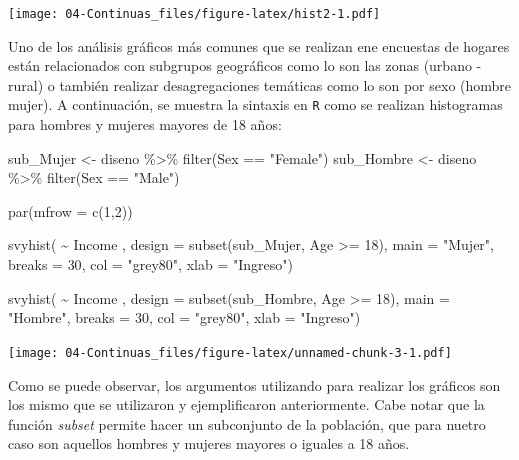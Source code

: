 \documentclass[
  12pt,
]{book}
\newenvironment{Shaded}{\begin{snugshade}}{\end{snugshade}}
\newcommand{\AttributeTok}[1]{\textcolor[rgb]{0.77,0.63,0.00}{#1}}
\newcommand{\DecValTok}[1]{\textcolor[rgb]{0.00,0.00,0.81}{#1}}
\newcommand{\FunctionTok}[1]{\textcolor[rgb]{0.00,0.00,0.00}{#1}}
\newcommand{\NormalTok}[1]{#1}
\newcommand{\OtherTok}[1]{\textcolor[rgb]{0.56,0.35,0.01}{#1}}
\newcommand{\SpecialCharTok}[1]{\textcolor[rgb]{0.00,0.00,0.00}{#1}}
\newcommand{\StringTok}[1]{\textcolor[rgb]{0.31,0.60,0.02}{#1}}
\begin{document}
\texttt{[image: 04-Continuas\_files/figure-latex/hist2-1.pdf]}

Uno de los análisis gráficos más comunes que se realizan ene encuestas de hogares están relacionados con subgrupos geográficos como lo son las zonas (urbano - rural) o también realizar desagregaciones temáticas como lo son por sexo (hombre mujer). A continuación, se muestra la sintaxis en \texttt{R} como se realizan histogramas para hombres y mujeres mayores de 18 años:

\begin{Shaded}
\begin{Highlighting}[]
\NormalTok{sub\_Mujer  }\OtherTok{\textless{}{-}}\NormalTok{ diseno }\SpecialCharTok{\%\textgreater{}\%}  \FunctionTok{filter}\NormalTok{(Sex }\SpecialCharTok{==} \StringTok{"Female"}\NormalTok{)}
\NormalTok{sub\_Hombre }\OtherTok{\textless{}{-}}\NormalTok{ diseno }\SpecialCharTok{\%\textgreater{}\%}  \FunctionTok{filter}\NormalTok{(Sex }\SpecialCharTok{==} \StringTok{"Male"}\NormalTok{)}

\FunctionTok{par}\NormalTok{(}\AttributeTok{mfrow =} \FunctionTok{c}\NormalTok{(}\DecValTok{1}\NormalTok{,}\DecValTok{2}\NormalTok{))}

\FunctionTok{svyhist}\NormalTok{(}
  \SpecialCharTok{\textasciitilde{}}\NormalTok{ Income ,}
  \AttributeTok{design =} \FunctionTok{subset}\NormalTok{(sub\_Mujer, Age }\SpecialCharTok{\textgreater{}=} \DecValTok{18}\NormalTok{),}
  \AttributeTok{main =} \StringTok{"Mujer"}\NormalTok{,}
  \AttributeTok{breaks =} \DecValTok{30}\NormalTok{,}
  \AttributeTok{col =} \StringTok{"grey80"}\NormalTok{,}
  \AttributeTok{xlab =} \StringTok{"Ingreso"}\NormalTok{)}

\FunctionTok{svyhist}\NormalTok{(}
  \SpecialCharTok{\textasciitilde{}}\NormalTok{ Income ,}
  \AttributeTok{design =} \FunctionTok{subset}\NormalTok{(sub\_Hombre, Age }\SpecialCharTok{\textgreater{}=} \DecValTok{18}\NormalTok{),}
  \AttributeTok{main =} \StringTok{"Hombre"}\NormalTok{,}
  \AttributeTok{breaks =} \DecValTok{30}\NormalTok{,}
  \AttributeTok{col =} \StringTok{"grey80"}\NormalTok{,}
  \AttributeTok{xlab =} \StringTok{"Ingreso"}\NormalTok{)}
\end{Highlighting}
\end{Shaded}

\texttt{[image: 04-Continuas\_files/figure-latex/unnamed-chunk-3-1.pdf]}

Como se puede observar, los argumentos utilizando para realizar los gráficos son los mismo que se utilizaron y ejemplificaron anteriormente. Cabe notar que la función \emph{subset} permite hacer un subconjunto de la población, que para nuetro caso son aquellos hombres y mujeres mayores o iguales a 18 años.
\end{document}
